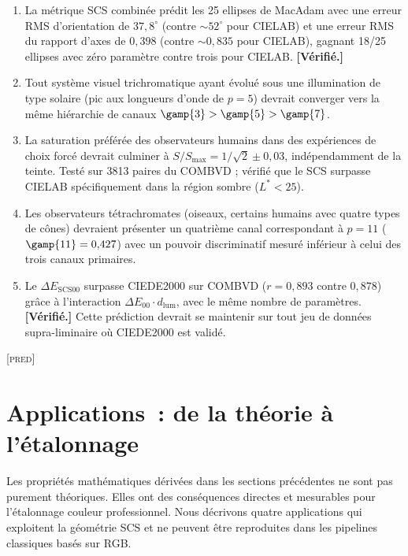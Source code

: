 \documentclass[12pt,a4paper]{article}
\begin{document}
\begin{predictionbox}
\begin{enumerate}[nosep]
\item La m\'etrique SCS combin\'ee pr\'edit les 25 ellipses de MacAdam
  avec une erreur RMS d'orientation de $37{,}8^\circ$ (contre
  $\sim\!52^\circ$ pour CIELAB) et une erreur RMS du rapport d'axes de
  $0{,}398$ (contre $\sim\!0{,}835$ pour CIELAB), gagnant 18/25 ellipses
  avec z\'ero param\`etre contre trois pour CIELAB.
  \textbf{[V\'erifi\'e.]}
\item Tout syst\`eme visuel trichromatique ayant \'evolu\'e sous une
  illumination de type solaire (pic aux longueurs d'onde de $p=5$)
  devrait converger vers la m\^eme hi\'erarchie de canaux
  $\gamp{3} > \gamp{5} > \gamp{7}$.
\item La saturation pr\'ef\'er\'ee des observateurs humains dans des
  exp\'eriences de choix forc\'e devrait culminer \`a
  $S/S_{\max} = 1/\sqrt{2} \pm 0{,}03$, ind\'ependamment de la teinte.
  Test\'e sur 3813 paires du COMBVD ; v\'erifi\'e que le SCS surpasse
  CIELAB sp\'ecifiquement dans la r\'egion sombre ($L^*<25$).
\item Les observateurs t\'etrachromates (oiseaux, certains humains avec
  quatre types de c\^ones) devraient pr\'esenter un quatri\`eme canal
  correspondant \`a $p = 11$ ($\gamp{11} = 0{,}427$) avec un pouvoir
  discriminatif mesur\'e inf\'erieur \`a celui des trois canaux
  primaires.
\item Le $\Delta E_{\mathrm{SCS00}}$ surpasse CIEDE2000 sur COMBVD
  ($r = 0{,}893$ contre $0{,}878$) gr\^ace \`a l'interaction
  $\Delta E_{00} \cdot d_{\mathrm{lum}}$, avec le m\^eme nombre de
  param\`etres. \textbf{[V\'erifi\'e.]} Cette pr\'ediction devrait se
  maintenir sur tout jeu de donn\'ees supra-liminaire o\`u CIEDE2000 est
  valid\'e.
\end{enumerate}
\textsc{[pred]}
\end{predictionbox}

\section{Applications~: de la th\'eorie \`a l'\'etalonnage}
\label{sec:applications}

Les propri\'et\'es math\'ematiques d\'eriv\'ees dans les sections
pr\'ec\'edentes ne sont pas purement th\'eoriques. Elles ont des
cons\'equences directes et mesurables pour l'\'etalonnage couleur
professionnel. Nous d\'ecrivons quatre applications qui exploitent la
g\'eom\'etrie SCS et ne peuvent \^etre reproduites dans les pipelines
classiques bas\'es sur RGB.
\end{document}
